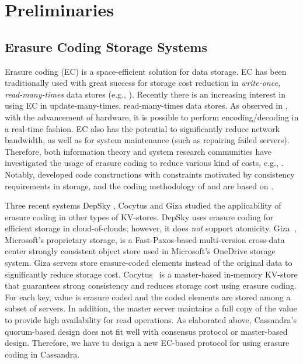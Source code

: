 \section{Preliminaries}

\subsection{Erasure Coding Storage Systems}
Erasure coding (EC) is a space-efficient solution for data storage. 
EC has been traditionally used with great success for storage cost reduction in \textit{write-once, read-many-times} data stores (e.g., \cite{rashmi_fast15, dimakis2011survey, sathiamoorthy, HuaSimXu_etal_azure, DepSky13}). Recently there is an increasing interest in using EC in update-many-times, read-many-times data stores. As observed in \cite{Cocytus2016,GIZA2017}, with the advancement of hardware, it is possible to perform encoding/decoding in a real-time fashion.
EC also has the potential to significantly reduce network bandwidth, as well as for system maintenance (such as repairing failed servers).
Therefore, both information theory and system research communities have investigated the usage of erasure coding to reduce various kind of costs, e.g., \cite{dimakis2010network, rashmi2016ec, tamo2014family}. Notably, \cite{wang2018multi} developed code constructions with constraints motivated by consistency requirements in storage, and the coding methodology of \treasmod{} and \oreas{} are based on  \cite{wang2018multi}. 

Three recent systems DepSky \cite{DepSky13}, Cocytus \cite{Cocytus2016} and Giza \cite{GIZA2017} studied the applicability of erasure coding in other types of KV-stores. DepSky \cite{DepSky13} uses erasure coding for efficient storage in cloud-of-clouds; however, it does \textit{not} support atomicity.
Giza~\cite{GIZA2017}, Microsoft's proprietary storage,  is a Fast-Paxos-based  multi-version cross-data center strongly consistent object store used in Microsoft's OneDrive storage system. Giza servers store erasure-coded elements instead of the original data to significantly reduce storage cost. 
Cocytus~\cite{Cocytus2016} is a master-based in-memory KV-store that guarantees strong consistency and reduces storage cost using erasure coding.  For each key,  value is erasure coded and the coded elements are stored among a subset of servers. In addition, the master server maintains a full copy of the value to provide high availability for read operations. 
As elaborated above, Cassandra's quorum-based design does not fit well with consensus protocol or master-based design.
Therefore, we have to design a new EC-based protocol for using erasure coding in Cassandra.

